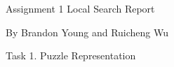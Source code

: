 \documentclass[12pt, letterpaper]{article}
\begin{document}
Assignment 1 Local Search Report

By Brandon Young and Ruicheng Wu

\bigskip

Task 1. Puzzle Representation \\
\end{document}
